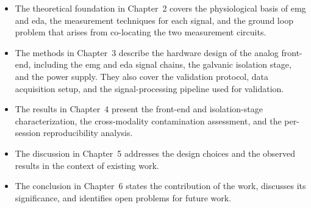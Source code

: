 \begin{itemize}
    \item The theoretical foundation in Chapter~2 covers the physiological basis of \gls{emg} and \gls{eda}, the measurement techniques for each signal, and the ground loop problem that arises from co-locating the two measurement circuits.

    \item The methods in Chapter~3 describe the hardware design of the analog front-end, including the \gls{emg} and \gls{eda} signal chains, the galvanic isolation stage, and the power supply. They also cover the validation protocol, data acquisition setup, and the signal-processing pipeline used for validation.

    \item The results in Chapter~4 present the front-end and isolation-stage characterization, the cross-modality contamination assessment, and the per-session reproducibility analysis.

    \item The discussion in Chapter~5 addresses the design choices and the observed results in the context of existing work.

    \item The conclusion in Chapter~6 states the contribution of the work, discusses its significance, and identifies open problems for future work.
\end{itemize}

